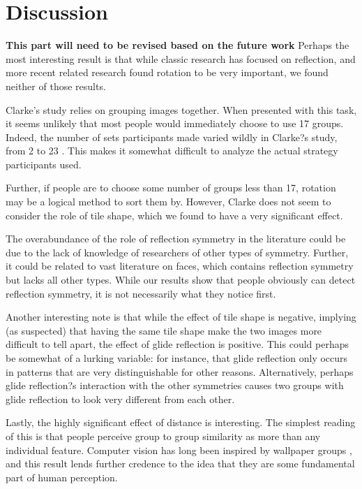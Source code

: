 \section{Discussion}
\textbf{This part will need to be revised based on the future work}
Perhaps the most interesting result is that while classic research has focused on reflection, and more recent related research found rotation to be very important, we found neither of those results.

Clarke's study relies on grouping images together. When presented with this task, it seems unlikely that most people would immediately choose to use 17 groups. Indeed, the number of sets participants made varied wildly in Clarke?s study, from 2 to 23 \citep{clarke}. This makes it somewhat difficult to analyze the actual strategy participants used.

Further, if people are to choose some number of groups less than 17, rotation may be a logical method to sort them by. However, Clarke does not seem to consider the role of tile shape, which we found to have a very significant effect.

The overabundance of the role of reflection symmetry in the literature could be due to the lack of knowledge of researchers of other types of symmetry. Further, it could be related to vast literature on faces, which contains reflection symmetry but lacks all other types. While our results show that people obviously can detect reflection symmetry, it is not necessarily what they notice first.

Another interesting note is that while the effect of tile shape is negative, implying (as suspected) that having the same tile shape make the two images more difficult to tell apart, the effect of glide reflection is positive. This could perhaps be somewhat of a lurking variable: for instance, that glide reflection only occurs in patterns that are very distinguishable for other reasons. Alternatively, perhaps glide reflection?s interaction with the other symmetries causes two groups with glide reflection to look very different from each other.

Lastly, the highly significant effect of distance is interesting. The simplest reading of this is that people perceive group to group similarity as more than any individual feature. Computer vision has long been inspired by wallpaper groups \citep{yanxi1}\citep{yanxi2}, and this result lends further credence to the idea that they are some fundamental part of human perception.